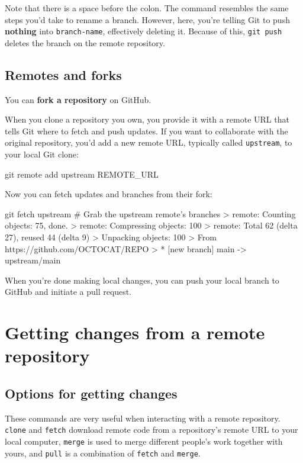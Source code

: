 Note that there is a space before the colon. The command resembles the same steps you'd take to rename a branch. However, here, you're telling Git to push \textbf{nothing} into \texttt{branch-name}, effectively deleting it. Because of this, \texttt{git push} deletes the branch on the remote repository. 

\subsection{Remotes and forks}

You can \textbf{fork a repository} on GitHub. 

When you clone a repository you own, you provide it with a remote URL that tells Git where to fetch and push updates. If you want to collaborate with the original repository, you'd add a new remote URL, typically called \texttt{upstream}, to your local Git clone:
\begin{codeblock}[language=bash]
git remote add upstream REMOTE_URL 
\end{codeblock}

Now you can fetch updates and branches from their fork:
\begin{codeblock}[language=bash]
git fetch upstream
# Grab the upstream remote's branches
> remote: Counting objects: 75, done.
> remote: Compressing objects: 100%
> remote: Total 62 (delta 27), reused 44 (delta 9)
> Unpacking objects: 100%
> From https://github.com/OCTOCAT/REPO
>  * [new branch]      main     -> upstream/main
\end{codeblock}

When you're done making local changes, you can push your local branch to GitHub and initiate a pull request. 

\section{Getting changes from a remote repository}

\subsection{Options for getting changes}
These commands are very useful when interacting with a remote repository. \texttt{clone} and \texttt{fetch} download remote code from a repository's remote URL to your local computer, \texttt{merge} is used to merge different people's work together with yours, and \texttt{pull} is a combination of \texttt{fetch} and \texttt{merge}.

